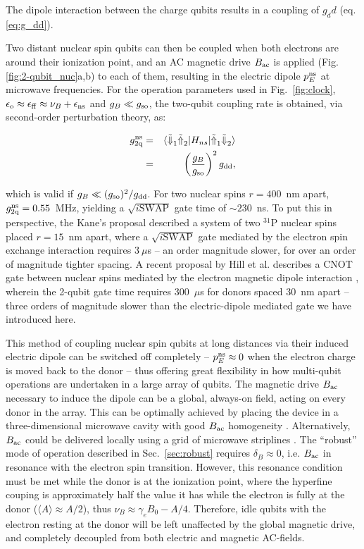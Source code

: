 The dipole interaction between the charge qubits results in a coupling of $g_dd$ (eq. \eqref{eq:g_dd}). 

Two distant nuclear spin qubits can then be coupled when both electrons are around their ionization point, and an AC magnetic drive $B_{\rm ac}$ is applied (Fig. \ref{fig:2-qubit_nuc}a,b) to each of them, resulting in the electric dipole $p_E^{\rm ns}$ at microwave frequencies. For the operation parameters used in Fig.~\ref{fig:clock}, $\epsilon_{\rm o}\approx\epsilon_{\rm ff}\approx\nu_B+\epsilon_{\rm ns}$ and $g_B\ll g_{\rm so}$, the two-qubit coupling rate is obtained, via second-order perturbation theory, as:

\begin{eqnarray} \label{eq:nucSWAP}
g_{\rm 2q}^{\rm ns} & = & \langle \tilde{\Downarrow}_1 \tilde{\Uparrow}_2|H_{ns}|\tilde{\Uparrow}_1 \tilde{\Downarrow}_2\rangle\\
 & =& \left(\frac{g_B}{g_{\rm so}}\right)^2g_{\rm dd},
\end{eqnarray}
 
which is valid if $g_B\ll (g_{\rm so})^2/g_{\rm dd}$. For two nuclear spins $r=400$~nm apart, $g_{\rm 2q}^{\rm ns}=0.55$~MHz, yielding a $\sqrt{i\mathrm{SWAP}}$ gate time of $\sim230$~ns. To put this in perspective, the Kane's proposal \cite{Kane1998} described a system of  two $^{31}$P nuclear spins placed $r=15$~nm apart, where a $\sqrt{i\mathrm{SWAP}}$ gate mediated by the electron spin exchange interaction requires $3~\mu$s -- an order magnitude slower, for over an order of magnitude tighter spacing. A recent proposal by Hill et al. describes a CNOT gate between nuclear spins mediated by the electron magnetic dipole interaction \cite{Hill2015}, wherein the 2-qubit gate time requires 300~$\mu$s for donors spaced $30$~nm apart -- three orders of magnitude slower than the electric-dipole mediated gate we have introduced here.



This method of coupling nuclear spin qubits at long distances via their induced electric dipole can be switched off completely -- $p_E^{\rm ns} \approx 0$ when the electron charge is moved back to the donor -- thus offering great flexibility in how multi-qubit operations are undertaken in a large array of qubits. The magnetic drive $B_{\rm ac}$ necessary to induce the dipole can be a global, always-on field, acting on every donor in the array. This can be optimally achieved by placing the device in a three-dimensional microwave cavity with good $B_{\rm ac}$ homogeneity \cite{Angerer2016}. Alternatively, $B_{\rm ac}$ could be delivered locally using a grid of microwave striplines \cite{Li2018}. The ``robust'' mode of operation described in Sec.~\ref{sec:robust} requires $\delta_B \approx 0$, i.e. $B_{\rm ac}$ in resonance with the electron spin transition. However, this resonance condition must be met while the donor is at the ionization point, where the hyperfine couping is approximately half the value it has while the electron is fully at the donor ($\langle A\rangle \approx A/2$), thus $\nu_B \approx \gamma_e B_0 - A/4$. Therefore, idle qubits with the electron resting at the donor will be left unaffected by the global magnetic drive, and completely decoupled from both electric and magnetic AC-fields.


